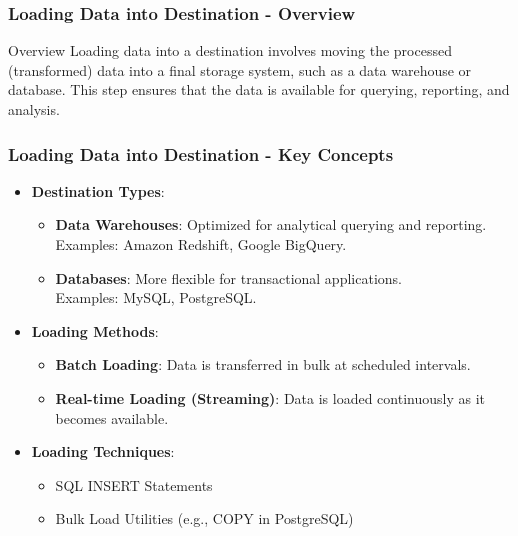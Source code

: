 \documentclass[aspectratio=169]{beamer}
\begin{document}
\begin{frame}[fragile]
    \frametitle{Loading Data into Destination - Overview}
    \begin{block}{Overview}
        Loading data into a destination involves moving the processed (transformed) data into a final storage system, such as a data warehouse or database. 
        This step ensures that the data is available for querying, reporting, and analysis.
    \end{block}
\end{frame}

\begin{frame}[fragile]
    \frametitle{Loading Data into Destination - Key Concepts}
    \begin{itemize}
        \item \textbf{Destination Types}:
            \begin{itemize}
                \item \textbf{Data Warehouses}: Optimized for analytical querying and reporting. \\
                      Examples: Amazon Redshift, Google BigQuery.
                \item \textbf{Databases}: More flexible for transactional applications. \\
                      Examples: MySQL, PostgreSQL.
            \end{itemize}
        
        \item \textbf{Loading Methods}:
            \begin{itemize}
                \item \textbf{Batch Loading}: Data is transferred in bulk at scheduled intervals.
                \item \textbf{Real-time Loading (Streaming)}: Data is loaded continuously as it becomes available.
            \end{itemize}

        \item \textbf{Loading Techniques}:
            \begin{itemize}
                \item SQL INSERT Statements
                \item Bulk Load Utilities (e.g., COPY in PostgreSQL)
            \end{itemize}
    \end{itemize}
\end{frame}
\end{document}
